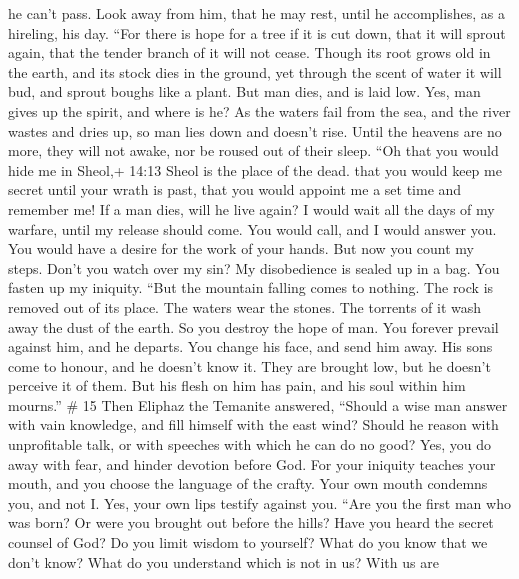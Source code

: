 he can't pass.  Look away from him, that he may rest, until
he accomplishes, as a hireling, his day.  ``For there is
hope for a tree if it is cut down, that it will sprout again, that the
tender branch of it will not cease.  Though its root grows
old in the earth, and its stock dies in the ground,  yet
through the scent of water it will bud, and sprout boughs like a plant.
 But man dies, and is laid low. Yes, man gives up the
spirit, and where is he?  As the waters fail from the sea,
and the river wastes and dries up,  so man lies down and
doesn't rise. Until the heavens are no more, they will not awake, nor be
roused out of their sleep.  ``Oh that you would hide me in
Sheol,+ 14:13 Sheol is the place of the dead. that you would keep me
secret until your wrath is past, that you would appoint me a set time
and remember me!  If a man dies, will he live again? I
would wait all the days of my warfare, until my release should come.
 You would call, and I would answer you. You would have a
desire for the work of your hands.  But now you count my
steps. Don't you watch over my sin?  My disobedience is
sealed up in a bag. You fasten up my iniquity.  ``But the
mountain falling comes to nothing. The rock is removed out of its place.
 The waters wear the stones. The torrents of it wash away
the dust of the earth. So you destroy the hope of man.  You
forever prevail against him, and he departs. You change his face, and
send him away.  His sons come to honour, and he doesn't
know it. They are brought low, but he doesn't perceive it of them.
 But his flesh on him has pain, and his soul within him
mourns.'' \# 15  Then Eliphaz the Temanite answered,
 ``Should a wise man answer with vain knowledge, and fill
himself with the east wind?  Should he reason with
unprofitable talk, or with speeches with which he can do no good?
 Yes, you do away with fear, and hinder devotion before God.
 For your iniquity teaches your mouth, and you choose the
language of the crafty.  Your own mouth condemns you, and
not I. Yes, your own lips testify against you.  ``Are you
the first man who was born? Or were you brought out before the hills?
 Have you heard the secret counsel of God? Do you limit
wisdom to yourself?  What do you know that we don't know?
What do you understand which is not in us?  With us are
